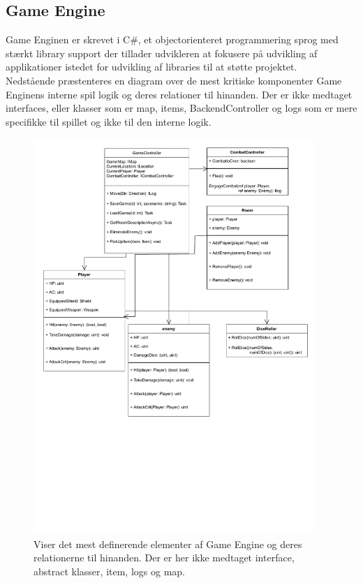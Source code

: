 \subsection{Game Engine}
Game Enginen er skrevet i C\#, et objectorienteret programmering sprog
med stærkt library support der tillader udvikleren at fokusere på udvikling
af applikationer istedet for udvikling af libraries til at støtte projektet. \\

\noindent Nedstående præstenteres en diagram over de mest kritiske komponenter
Game Enginens interne spil logik og deres relationer til hinanden.
Der er ikke medtaget interfaces, eller klasser som er map, items, BackendController 
og logs som er mere specifikke til spillet og ikke til den interne logik.\\

\begin{figure}[H]
  \centering
   
  \includegraphics[width=0.9\linewidth, height=15cm, trim = 0 8cm 0 3cm]{02-Body/Implementering/GameEngineImplementering/Images/Core Class Diagram.pdf}
  \caption{Viser det mest definerende elementer af Game Engine og deres relationerne til hinanden. Der er her ikke medtaget interface,
           abstract klasser, item, logs og map. }%
  \label{fig:CoreClassDiagram}
\end{figure}

